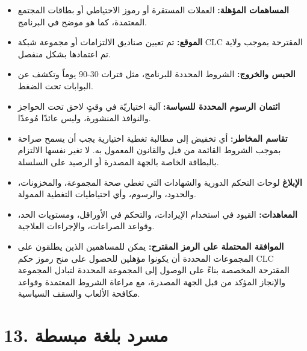 \documentclass[11pt]{article}
\begin{document}
\begin{itemize}[leftmargin=*]
\item \textbf{المساهمات المؤهلة:} العملات المستقرة أو رموز الاحتياطي أو بطاقات المجتمع المعتمدة، كما هو موضح في البرنامج.
\item \textbf{الموقع:} تم تعيين صناديق الالتزامات أو مجموعة شبكة CLC المقترحة بموجب ولاية تم اعتمادها بشكل منفصل.
\item \textbf{الحبس والخروج:} الشروط المحددة للبرنامج، مثل فترات 30-90 يوماً وتكشف عن البوابات تحت الضغط.
\item \textbf{ائتمان الرسوم المحددة للسياسة:} آلية اختياريّة في وقتٍ لاحق تحت الحواجز والنوافذ المنشورة، وليس عائدًا مُوعدًا.
\item \textbf{تقاسم المخاطر:} أي تخفيض إلى مطالبة تغطية اختيارية يجب أن يسمح صراحة بموجب الشروط القائمة من قبل والقانون المعمول به. لا تغير نفسها الالتزام بالبطاقة الخاصة بالجهة المصدرة أو الرصيد على السلسلة.
\item \textbf{الإبلاغ} لوحات التحكم الدورية والشهادات التي تغطي صحة المجموعة، والمخزونات، والحدود، والرسوم، وأي احتياطيات التغطية الممولة.
\item \textbf{المعاهدات:} القيود في استخدام الإيرادات، والتحكم في الأوراقل، ومستويات الحد، وقواعد الصراعات، والإجراءات العلاجية.
\item \textbf{الموافقة المحتملة على الرمز المقترح:} يمكن للمساهمين الذين يطلقون على المجموعات المحددة أن يكونوا مؤهلين للحصول على منح رموز حكم CLC المقترحة المخصصة بناءً على الوصول إلى المجموعة المحددة لتبادل المجموعة والإنجاز المؤكد من قبل الجهة المصدرة، مع مراعاة الشروط المعتمدة وقواعد مكافحة الألعاب والسقف السياسية.
\end{itemize}


\section*{13. مسرد بلغة مبسطة}
\end{document}
